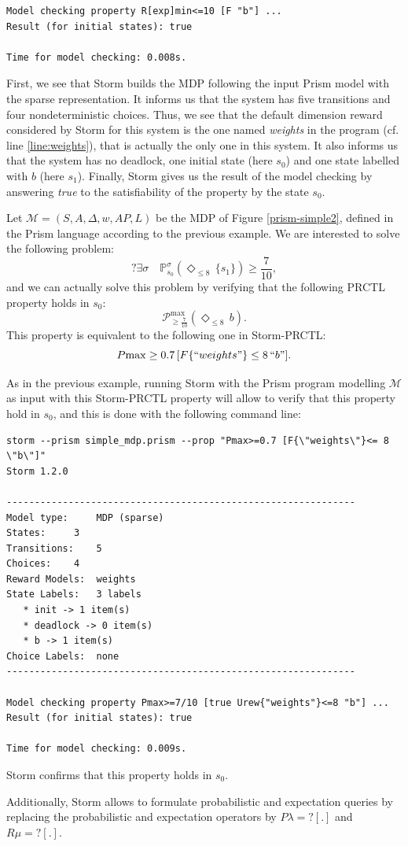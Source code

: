 \begin{example}
{\begin{verbatim}
Model checking property R[exp]min<=10 [F "b"] ...
Result (for initial states): true

Time for model checking: 0.008s.
\end{verbatim}
}
First, we see that Storm builds the MDP following the input Prism model with the sparse representation. It informs us that the system has five transitions and four nondeterministic choices. Thus, we see that the default dimension reward considered by Storm for this system is the one named \textit{weights} in the program (cf. line \ref{line:weights}), that is actually the only one in this system.
It also informs us that the system has no deadlock, one initial state (here $s_0$) and one state labelled with $b$ (here $s_1$).
Finally, Storm gives us the result of the model checking by answering \textit{true} to the satisfiability of the property by the state $s_0$.
\end{example}
\begin{example}
Let $\mathcal{M}=(S, A, \Delta, w, AP, L)$ be the MDP of Figure \ref{prism-simple2}, defined in the Prism language according to the previous example. We are interested to solve the following \SSPP{} problem:
\[
  ? \exists \sigma \quad \mathbb{P}_{s_0}^\sigma(\Diamond_{\leq 8}\, \{s_1\}) \geq \frac{7}{10},
\]
and we can actually solve this problem by verifying that the following PRCTL property holds in $s_0$:
\[
  \mathcal{P}^{\max}_{\geq \frac{7}{10}}(\Diamond_{\leq 8}\, b).
\]
This property is equivalent to the following one in Storm-PRCTL:
\[
  P{\max}\geq 0.7 \, [F\{``weights"\}\leq 8 \, ``b"].
\]

As in the previous example, running Storm with the Prism program modelling $\mathcal{M}$ as input with this Storm-PRCTL property will allow to verify that this property hold in $s_0$, and this is done with the following command line:

{\footnotesize
\begin{verbatim}
storm --prism simple_mdp.prism --prop "Pmax>=0.7 [F{\"weights\"}<= 8 \"b\"]"
Storm 1.2.0

--------------------------------------------------------------
Model type: 	MDP (sparse)
States: 	3
Transitions: 	5
Choices: 	4
Reward Models:  weights
State Labels: 	3 labels
   * init -> 1 item(s)
   * deadlock -> 0 item(s)
   * b -> 1 item(s)
Choice Labels: 	none
--------------------------------------------------------------

Model checking property Pmax>=7/10 [true Urew{"weights"}<=8 "b"] ...
Result (for initial states): true

Time for model checking: 0.009s.
\end{verbatim}
}
\noindent Storm confirms that this property holds in $s_0$.
\end{example}
Additionally, Storm allows to formulate probabilistic and expectation queries by replacing the probabilistic and expectation operators by $P\lambda=?[.]$ and $R\mu=?[.]$.

